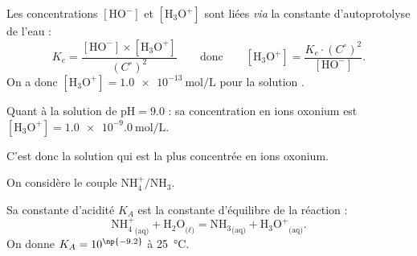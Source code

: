 \reponse{\reponseB}

\begin{corrige}
Les concentrations $[\text{HO}^-]$ et $[\text{H}_3\text{O}^+]$ sont liées \emph{via} la  constante d'autoprotolyse de l'eau : \vspace{-2mm}
\[
K_e=\frac{[\text{HO}^-]\times[\text{H}_3\text{O}^+]}{(C^\circ)^2}
\qquad\text{donc}\qquad
[\text{H}_3\text{O}^+]=\frac{K_e\cdot (C^\circ)^2}{[\text{HO}^-]}.
\]
On a donc $\mathrm{[H_3O^+]}=\SI{1.0e-13}{\mole\per\liter}$ pour la solution \reponseA.

Quant à la solution de $\text{pH}=\num{9,0}$ : sa concentration en ions oxonium est $\mathrm{[H_3O^+]}=\SI{1.0e-9,0}{\mole\per\liter}$.

C'est donc la solution \reponseB{} qui est la plus concentrée en ions oxonium.
\end{corrige}


\finEntrainement


\newpage




\hauteurLargeurCadreReponse		{10mm}{5cm}
\typeEntrainement				{} %
\initialisationEntrainement

On considère le couple $\mathrm{NH_4^+/NH_3}$. 

Sa constante d'acidité $K_A$  est la constante d'équilibre de la réaction : 
\[
\mathrm{NH_4^+}_\text{(aq)}+
\mathrm{H_2O}_\text{($\ell$)}=
\mathrm{NH_3}_\text{(aq)}
+\mathrm{H_3O^+}_\text{(aq)}.
\]
On donne $K_A=10^{\np{-9.2}}$ à \SI{25}{\celsius}.

\debutEntrainement


